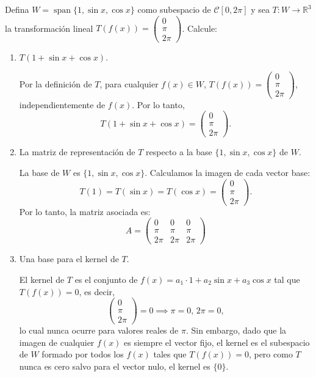 \begin{prob}
Defina $W = \operatorname{span}\{1, \sin x, \cos x\}$ como subespacio de $\mathcal{C}[0,2\pi]$ y sea $T: W \rightarrow \mathbb{R}^3$ la transformación lineal $T(f(x)) = \begin{pmatrix} 0 \\ \pi \\ 2\pi \end{pmatrix}$. Calcule:

\begin{enumerate}[$a)$]
\item $T(1 + \sin x + \cos x)$.
\begin{myproof}
Por la definición de $T$, para cualquier $f(x) \in W$, $T(f(x)) = \begin{pmatrix} 0 \\ \pi \\ 2\pi \end{pmatrix}$, independientemente de $f(x)$. Por lo tanto,
\[
T(1 + \sin x + \cos x) = \begin{pmatrix} 0 \\ \pi \\ 2\pi \end{pmatrix}.
\]
\end{myproof}

\item La matriz de representación de $T$ respecto a la base $\{1, \sin x, \cos x\}$ de $W$.
\begin{myproof}
La base de $W$ es $\{1, \sin x, \cos x\}$. Calculamos la imagen de cada vector base:
\[
T(1) = T(\sin x) = T(\cos x) = \begin{pmatrix} 0 \\ \pi \\ 2\pi \end{pmatrix}.
\]
Por lo tanto, la matriz asociada es:
\[
A = \begin{pmatrix}
0 & 0 & 0 \\
\pi & \pi & \pi \\
2\pi & 2\pi & 2\pi
\end{pmatrix}
\]
\end{myproof}

\item Una base para el kernel de $T$.
\begin{myproof}
El kernel de $T$ es el conjunto de $f(x) = a_1 \cdot 1 + a_2 \sin x + a_3 \cos x$ tal que $T(f(x)) = 0$, es decir,
\[
\begin{pmatrix}
0 \\ \pi \\ 2\pi
\end{pmatrix} = 0 \implies \pi = 0,\, 2\pi = 0,
\]
lo cual nunca ocurre para valores reales de $\pi$. Sin embargo, dado que la imagen de cualquier $f(x)$ es siempre el vector fijo, el kernel es el subespacio de $W$ formado por todos los $f(x)$ tales que $T(f(x)) = 0$, pero como $T$ nunca es cero salvo para el vector nulo, el kernel es $\{0\}$.


\end{myproof}
\end{enumerate}
\end{prob}
